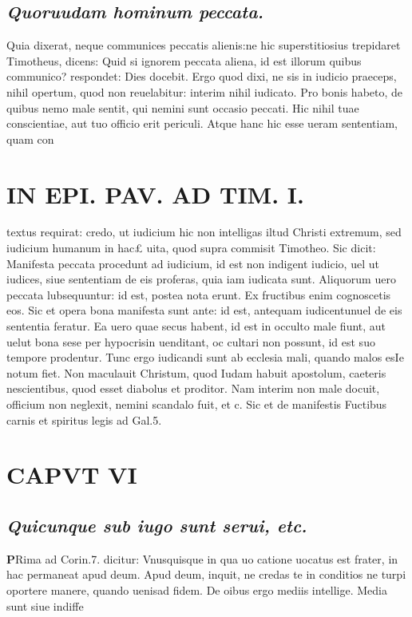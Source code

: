 \documentclass{article}
\begin{document}
\begin{pages}
\subsection*{\textit{Quoruudam hominum peccata. }}\pstart Quia dixerat, neque communices peccatis alienis:ne hic superstitiosius trepidaret Timotheus, dicens: Quid si ignorem peccata aliena, id est illorum quibus communico? respondet: Dies docebit. Ergo quod dixi, ne sis in iudicio praeceps, nihil opertum, quod non reuelabitur: interim nihil iudicato. Pro bonis habeto, de quibus nemo male sentit, qui nemini sunt occasio peccati. Hic nihil tuae conscientiae, aut tuo officio erit periculi. Atque hanc hic esse ueram sententiam, quam con  \pend
\section*{IN EPI. PAV. AD TIM. I. }
\marginpar{[ p.97 ]}\pstart textus requirat: credo, ut iudicium hic non intelligas iltud Christi extremum, sed iudicium humanum in hac£ uita, quod supra commisit Timotheo. Sic dicit: Manifesta peccata procedunt ad iudicium, id est non indigent iudicio, uel ut iudices, siue sententiam de eis proferas, quia iam iudicata sunt. Aliquorum uero peccata lubsequuntur: id est, postea nota erunt. Ex fructibus enim cognoscetis eos. Sic et opera bona manifesta sunt ante: id est, antequam iudicentunuel de eis sententia feratur. Ea uero quae secus habent, id est in occulto male fiunt, aut uelut bona sese per hypocrisin uenditant, oc cultari non possunt, id est suo tempore prodentur. Tunc ergo iudicandi sunt ab ecclesia mali, quando malos esIe notum fiet. Non maculauit Christum, quod Iudam habuit apostolum, caeteris nescientibus, quod esset diabolus et proditor. Nam interim non male docuit, officium non neglexit, nemini scandalo fuit, et c. Sic et de manifestis Fuctibus carnis et spiritus legis ad Gal.5.  \pend
\endnumbering\beginnumbering\section{CAPVT VI}
{}
\subsection*{\textit{Quicunque sub iugo sunt serui, etc. }}\pstart \huge\textbf{P}\normalsize Rima ad Corin.7. dicitur: Vnusquisque in qua uo catione uocatus est frater, in hac permaneat apud deum. Apud deum, inquit, ne credas te in conditios ne turpi oportere manere, quando uenisad fidem. De oibus ergo mediis intellige. Media sunt siue indiffe\pend

\end{pages}
\end{document}
